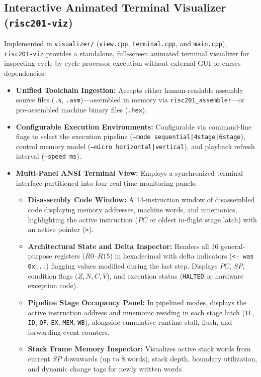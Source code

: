 \documentclass[11pt,a4paper]{article}
\begin{document}
\subsection{Interactive Animated Terminal Visualizer (\texttt{risc201-viz})}
Implemented in \texttt{visualizer/} (\texttt{view.cpp}, \texttt{terminal.cpp}, and \texttt{main.cpp}), \texttt{risc201-viz} provides a standalone, full-screen animated terminal visualizer for inspecting cycle-by-cycle processor execution without external GUI or curses dependencies:
\begin{itemize}
    \item \textbf{Unified Toolchain Ingestion:} Accepts either human-readable assembly source files (\texttt{.s}, \texttt{.asm})---assembled in memory via \texttt{risc201\_assembler}---or pre-assembled machine binary files (\texttt{.hex}).
    \item \textbf{Configurable Execution Environments:} Configurable via command-line flags to select the execution pipeline (\texttt{--mode sequential|4stage|6stage}), control memory model (\texttt{--micro horizontal|vertical}), and playback refresh interval (\texttt{--speed ms}).
    \item \textbf{Multi-Panel ANSI Terminal View:} Employs a synchronized terminal interface partitioned into four real-time monitoring panels:
    \begin{itemize}
        \item \textbf{Disassembly Code Window:} A 14-instruction window of disassembled code displaying memory addresses, machine words, and mnemonics, highlighting the active instruction ($PC$ or oldest in-flight stage latch) with an active pointer (\texttt{>}).
        \item \textbf{Architectural State and Delta Inspector:} Renders all 16 general-purpose registers ($R0$--$R15$) in hexadecimal with delta indicators (\texttt{<- was 0x...}) flagging values modified during the last step. Displays $PC$, $SP$, condition flags ($Z, N, C, V$), and execution status (\texttt{HALTED} or hardware exception code).
        \item \textbf{Pipeline Stage Occupancy Panel:} In pipelined modes, displays the active instruction address and mnemonic residing in each stage latch (\texttt{IF}, \texttt{ID}, \texttt{OF}, \texttt{EX}, \texttt{MEM}, \texttt{WB}), alongside cumulative runtime stall, flush, and forwarding event counters.
        \item \textbf{Stack Frame Memory Inspector:} Visualizes active stack words from current $SP$ downwards (up to 8 words), stack depth, boundary utilization, and dynamic change tags for newly written words.

\end{itemize}
\end{itemize}
\end{document}
